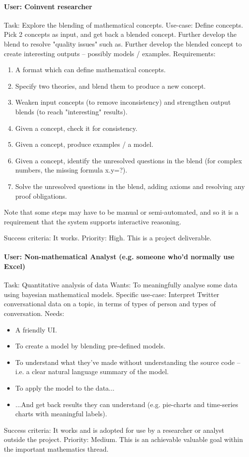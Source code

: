 \documentclass[10pt]{article}
\begin{document}
\begin{appendices}
\paragraph{User: Coinvent researcher}
Task: Explore the blending of mathematical concepts.      
Use-case: Define concepts. Pick 2 concepts as input, and get back a blended concept. Further develop the blend to resolve "quality issues" such as.
Further develop the blended concept to create interesting outputs -- possibly models / examples.   
Requirements: 
\begin{enumerate}
\item A format which can define mathematical concepts.
\item Specify two theories, and blend them to produce a new concept.
\item Weaken input concepts (to remove inconsistency) and strengthen output blends (to reach "interesting" results). 
\item Given a concept, check it for consistency.
\item Given a concept, produce examples / a model.
\item Given a concept, identify the unresolved questions in the blend (for complex numbers, the missing formula x.y=?).
\item Solve the unresolved questions in the blend, adding axioms and resolving any proof obligations.
\end{enumerate}
Note that some steps may have to be manual or semi-automated, and so it is a requirement that the
system supports interactive reasoning.

Success criteria: It works.       
Priority: High. This is a project deliverable.
 
 
\paragraph{User: Non-mathematical Analyst (e.g. someone who'd normally use Excel)}  
Task: Quantitative analysis of data   
Wants: To meaningfully analyse some data using bayesian mathematical models.   
Specific use-case: Interpret Twitter conversational data on a topic, in terms of types of person and types of conversation.   
Needs:
\begin{itemize}
 \item A friendly UI.
 \item To create a model by blending pre-defined models.
 \item To understand what they've made without understanding the source code -- i.e. a clear natural language summary of the model.
 \item To apply the model to the data...
 \item ...And get back results they can understand (e.g. pie-charts and time-series charts with meaningful labels).
\end{itemize}
Success criteria: It works and is adopted for use by a researcher or analyst outside the project.   
Priority: Medium. This is an achievable valuable goal within the important mathematics thread.



\end{appendices}
\end{document}
